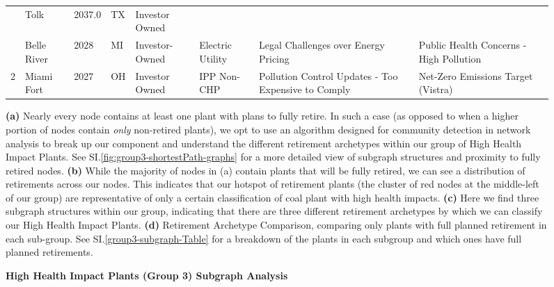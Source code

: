 \begin{figure}[H]
\begin{minipage}{1\textwidth}
\begin{adjustbox}{width=\textwidth}
\begin{small}
\begin{tabular}{cllllllll}
                    & Tolk & 2037.0 & TX & Investor Owned &  \\
                    & Belle River & 2028 & MI & Investor-Owned & Electric Utility & Legal Challenges over Energy Pricing & Public Health Concerns - High Pollution \\
                    \midrule
                    \multirow{1}{*}{2} & Miami Fort & 2027 & OH & Investor Owned & IPP Non-CHP & Pollution Control Updates - Too Expensive to Comply & Net-Zero Emissions Target (Vistra) \\
                    \midrule
                \end{tabular}
            \end{small}
        \end{adjustbox}
    \end{minipage}    

    \medskip

    \begin{minipage}{1\textwidth}
          
    \end{minipage}


    \caption{\textbf{High Health Impact Plants (Group 3) Subgraph Analysis}}
    \medskip
    \footnotesize
    \textbf{(a)} Nearly every node contains at least one plant with plans to fully retire. In such a case (as opposed to when a higher portion of nodes contain \textit{only} non-retired plants),
    we opt to use an algorithm designed for community detection in network analysis to break up our component and understand the different retirement archetypes within
    our group of High Health Impact Plants. See SI.\ref{fig:group3-shortestPath-graphs} for a more detailed view of subgraph structures and proximity to fully retired nodes.
    \textbf{(b)} While the majority of nodes in (a) contain plants that will be fully retired, we can see a distribution of retirements across our nodes. This indicates that our hotspot of retirement plants (the cluster of red nodes at the middle-left of our group) 
    are representative of only a certain classification of coal plant with high health impacts.
    \textbf{(c)} Here we find three subgraph structures within our group, indicating that 
    there are three different retirement archetypes by which we can classify our High Health Impact Plants.
    \textbf{(d)} Retirement Archetype Comparison, comparing only plants with full planned retirement in each sub-group. See SI.\ref{group3-subgraph-Table} for a breakdown of the plants in each subgroup and which ones have full planned retirements.
\end{figure}


